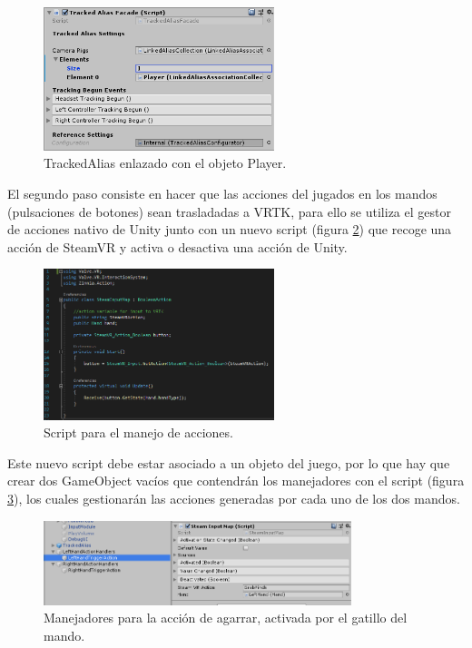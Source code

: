 \begin{figure}
  \centering
    \includegraphics[width=0.6\textwidth]{04.Desarrollo/01.Entrega1/02.Iteracion1_2/00.Figuras/04.tracked_alias.png}
    \caption{TrackedAlias enlazado con el objeto Player.}
    \label{fig:trackedAlias}
\end{figure}


El segundo paso consiste en hacer que las acciones del jugados en los mandos (pulsaciones de botones) sean trasladadas a VRTK, para ello se utiliza el gestor de acciones nativo de Unity junto con un nuevo script (figura \ref{fig:scriptInput}) que recoge una acción de SteamVR y activa o desactiva una acción de Unity.

\begin{figure}
  \centering
    \includegraphics[width=0.6\textwidth]{04.Desarrollo/01.Entrega1/02.Iteracion1_2/00.Figuras/05.steam_input_map.png}
    \caption{Script para el manejo de acciones.}
    \label{fig:scriptInput}
\end{figure}

Este nuevo script debe estar asociado a un objeto del juego, por lo que hay que crear dos GameObject vacíos que contendrán los manejadores con el script (figura \ref{fig:handlers}), los cuales gestionarán las acciones generadas por cada uno de los dos mandos.

\begin{figure}
  \centering
    \includegraphics[width=0.8\textwidth]{04.Desarrollo/01.Entrega1/02.Iteracion1_2/00.Figuras/06.handlers.png}
    \caption{Manejadores para la acción de agarrar, activada por el gatillo del mando.}
    \label{fig:handlers}
\end{figure}

